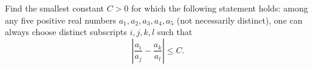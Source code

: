 Find the smallest constant 
$C > 0$
 for which the following statement holds: among any five positive real numbers 
$a_1,a_2,a_3,a_4,a_5$
 (not necessarily distinct), one can always choose distinct subscripts 
$i,j,k,l$
 such that
\[ \left| \frac{a_i}{a_j} - \frac {a_k}{a_l} \right| \le C. \]